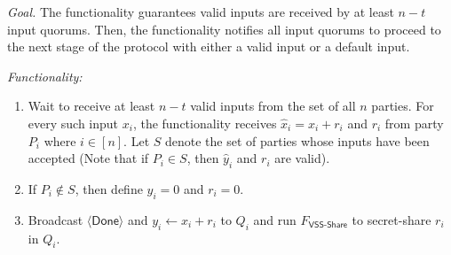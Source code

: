 \documentclass[11pt,letter]{article}
\newcommand{\func}[1]{\mbox{$F_\textsf{#1}$}}
\newcommand{\mask}[1]{\widehat{#1}}
\theoremstyle{mytheoremstyle}
\let\savedCaption=\caption
\renewcommand*{\caption}[1]{\savedCaption[#1]{~#1}}
\newcommand{\algfont}{}
\newcommand{\done}{$\langle\mathsf{Done}\rangle$\xspace}
\begin{document}
\begin{algorithm}
	\algfont
	\caption{\func{Input}}
	\label{fun:Input}
	
	\textit{Goal.} The functionality guarantees valid inputs are received by at least $n-t$ input quorums. Then, the functionality notifies all input quorums to proceed to the next stage of the protocol with either a valid input or a default input.
	\medskip
	
	\textit{Functionality:}
	\begin{enumerate}
		\item Wait to receive at least $n-t$ valid inputs from the set of all $n$ parties. For every such input $x_i$, the functionality receives $\mask{x}_i = x_i + r_i$ and $r_i$ from party $P_i$ where $i\in[n]$. Let $S$ denote the set of parties whose inputs have been accepted (Note that if $P_i \in S$, then $\mask{y}_i$ and $r_i$ are valid).
		
		\item  If $P_i \notin S$, then define $\mask{y}_i =0$ and $r_i = 0$.
		
		\item Broadcast $\mbox{\done}$ and $y_i{\leftarrow}{x_i+r_i}$ to $Q_i$ and run \func{VSS-Share} to secret-share $r_i$ in $Q_i$.	
	\end{enumerate}
\end{algorithm} 
\end{document}
